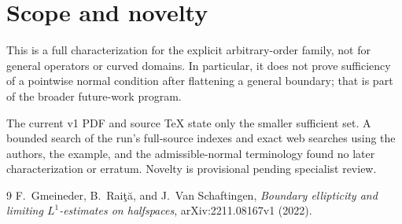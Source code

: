 \documentclass[11pt]{article}
\begin{document}
\section{Scope and novelty}

This is a full characterization for the explicit arbitrary-order family,
not for general operators or curved domains.  In particular, it does not
prove sufficiency of a pointwise normal condition after flattening a
general boundary; that is part of the broader future-work program.

The current v1 PDF and source TeX state only the smaller sufficient set.
A bounded search of the run's full-source indexes and exact web searches
using the authors, the example, and the admissible-normal terminology found
no later characterization or erratum.  Novelty is provisional pending
specialist review.

\begin{thebibliography}{9}
F.~Gmeineder, B.~Rai\c{t}\u{a}, and J.~Van Schaftingen,
\emph{Boundary ellipticity and limiting $L^1$-estimates on halfspaces},
arXiv:2211.08167v1 (2022).
\end{thebibliography}
\end{document}
